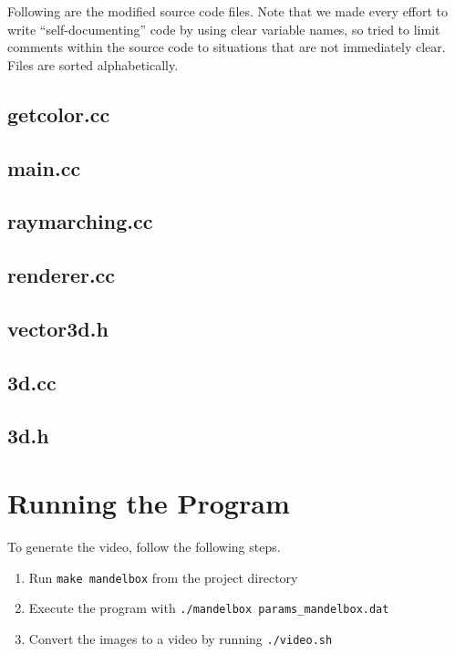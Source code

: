 \documentclass[11pt]{article}
\begin{document}
Following are the modified source code files. Note that we made every effort to write ``self-documenting'' code by using clear variable names, so tried to limit comments within the source code to situations that are not immediately clear. Files are sorted alphabetically.

\subsection{getcolor.cc}


\subsection{main.cc}


\subsection{raymarching.cc}


\subsection{renderer.cc}


\subsection{vector3d.h}


\subsection{3d.cc}


\subsection{3d.h}


\section{Running the Program}
To generate the video, follow the following steps.
\begin{enumerate}
\item Run \texttt{make mandelbox} from the project directory
\item Execute the program with \texttt{./mandelbox params\_mandelbox.dat}
\item Convert the images to a video by running \texttt{./video.sh}
\end{enumerate}
\end{document}
